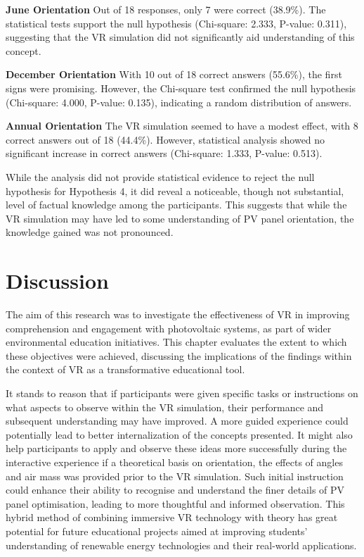 \documentclass[draft, final]{vutinfth} %
\begin{document}
\textbf{June Orientation}
Out of 18 responses, only 7 were correct (38.9\%). The statistical tests support the null hypothesis (Chi-square: 2.333, P-value: 0.311), suggesting that the VR simulation did not significantly aid understanding of this concept.

\textbf{December Orientation}
With 10 out of 18 correct answers (55.6\%), the first signs were promising. However, the Chi-square test confirmed the null hypothesis (Chi-square: 4.000, P-value: 0.135), indicating a random distribution of answers.

\textbf{Annual Orientation}
The VR simulation seemed to have a modest effect, with 8 correct answers out of 18 (44.4\%). However, statistical analysis showed no significant increase in correct answers (Chi-square: 1.333, P-value: 0.513).

While the analysis did not provide statistical evidence to reject the null hypothesis for Hypothesis 4, it did reveal a noticeable, though not substantial, level of factual knowledge among the participants. This suggests that while the VR simulation may have led to some understanding of PV panel orientation, the knowledge gained was not pronounced.

\chapter{Discussion}
The aim of this research was to investigate the effectiveness of VR in improving comprehension and engagement with photovoltaic systems, as part of wider environmental education initiatives. This chapter evaluates the extent to which these objectives were achieved, discussing the implications of the findings within the context of VR as a transformative educational tool.



It stands to reason that if participants were given specific tasks or instructions on what aspects to observe within the VR simulation, their performance and subsequent understanding may have improved. A more guided experience could potentially lead to better internalization of the concepts presented. It might also help participants to apply and observe these ideas more successfully during the interactive experience if a theoretical basis on orientation, the effects of angles and air mass was provided prior to the VR simulation. Such initial instruction could enhance their ability to recognise and understand the finer details of PV panel optimisation, leading to more thoughtful and informed observation. This hybrid method of combining immersive VR technology with theory has great potential for future educational projects aimed at improving students' understanding of renewable energy technologies and their real-world applications.
\end{document}
